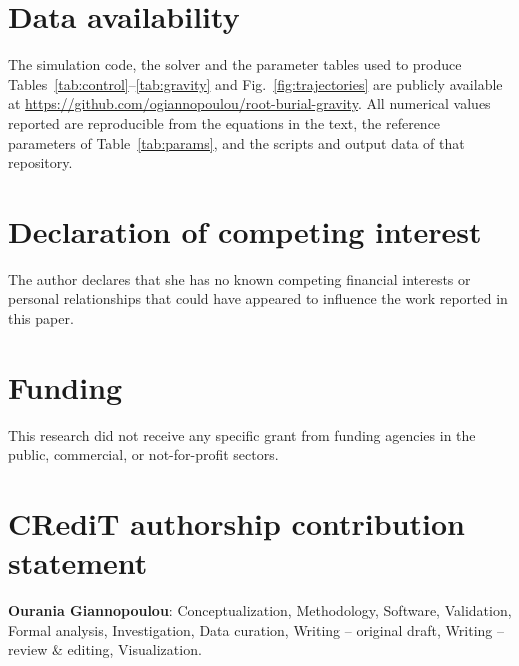 \documentclass[preprint,12pt]{elsarticle}
\begin{document}
\section*{Data availability}
The simulation code, the solver and the parameter tables used to produce
Tables~\ref{tab:control}--\ref{tab:gravity} and Fig.~\ref{fig:trajectories}
are publicly available at
\url{https://github.com/ogiannopoulou/root-burial-gravity}. All numerical
values reported are reproducible from the equations in the text,
the reference parameters of Table~\ref{tab:params}, and the scripts and
output data of that repository.

\section*{Declaration of competing interest}
The author declares that she has no known competing financial interests or
personal relationships that could have appeared to influence the work
reported in this paper.

\section*{Funding}
This research did not receive any specific grant from funding agencies in the
public, commercial, or not-for-profit sectors.

\section*{CRediT authorship contribution statement}
\textbf{Ourania Giannopoulou}: Conceptualization, Methodology, Software,
Validation, Formal analysis, Investigation, Data curation, Writing -- original
draft, Writing -- review \& editing, Visualization.



\end{document}
